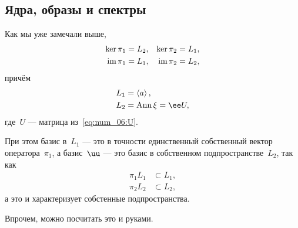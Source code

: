 \begin{solution}
	\subsection{Ядра, образы и спектры}
		Как мы уже замечали выше,
		\begin{align*}
			\ker{\pi_1} &= L_2,
			&
			\ker{\pi_2} &= L_1,
			\\
			\mathop{\mathrm{im}}\nolimits{\pi_1} &= L_1,
			&
			\mathop{\mathrm{im}}\nolimits{\pi_2} &= L_2,
		\end{align*}
		причём
		\begin{align*}
			L_1 &= \left< a \right>,
			\\
			L_2 &= \Ann{\xi} = \ee U,
		\end{align*}
		где~$U$ --- матрица из~\eqref{eq:num_06:U}.

		При этом базис в~$L_1$ --- это в точности единственный собственный вектор оператора~$\pi_1$, а базис~$\uu$ --- это базис в собственном подпространстве~$L_2$, так как
		\begin{align*}
			\pi_1 L_1 &\subset L_1,
			\\
			\pi_2 L_2 &\subset L_2,
		\end{align*}
		а это и характеризует собстенные подпространства.

		Впрочем, можно посчитать это и руками.



\end{solution}
